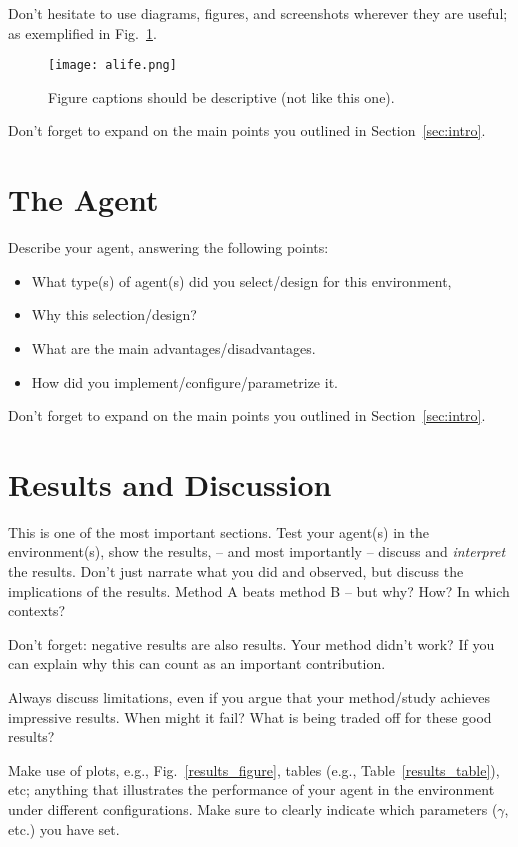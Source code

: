 \documentclass[journal, a4paper]{IEEEtran}
\begin{document}
Don't hesitate to use diagrams, figures, and screenshots wherever they are useful; as exemplified in Fig.~\ref{env_figure}.  

\begin{figure}[ht]
	\centering
	\texttt{[image: alife.png]}
	\caption{\label{env_figure}Figure captions should be descriptive (not like this one). }
\end{figure}

Don't forget to expand on the main points you outlined in Section~\ref{sec:intro}.


\section{The Agent}

Describe your agent, answering the following points:
\begin{itemize}
	\item What type(s) of agent(s) did you select/design for this environment, 
	\item Why this selection/design?
	\item What are the main advantages/disadvantages.
	\item How did you implement/configure/parametrize it. 
\end{itemize}

Don't forget to expand on the main points you outlined in Section~\ref{sec:intro}.

\section{Results and Discussion}

This is one of the most important sections. Test your agent(s) in the environment(s), show the results, -- and most importantly -- discuss and \emph{interpret} the results. Don't just narrate what you did and observed, but discuss the implications of the results. Method A beats method B -- but why? How? In which contexts?

Don't forget: negative results are also results. Your method didn't work? If you can explain why this can count as an important contribution. 

Always discuss limitations, even if you argue that your method/study achieves impressive results. When might it fail? What is being traded off for these good results?

Make use of plots, e.g., Fig.~\ref{results_figure}, tables (e.g., Table~\ref{results_table}), etc; anything that illustrates the performance of your agent in the environment under different configurations. Make sure to clearly indicate which parameters ($\gamma$, etc.) you have set. 
\end{document}
